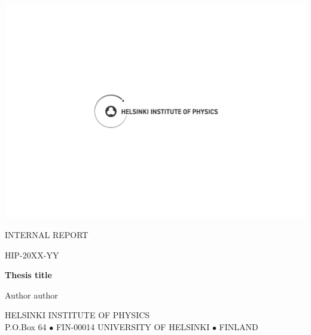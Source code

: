 \documentclass[a4paper, 12pt]{article}
\begin{document}
\begin{titlepage}
\begin{center}
\includegraphics[scale=1]{HIP-cover-logo.pdf}
\end{center}
\vspace{0.2 cm}
\begin{center}
\large
INTERNAL REPORT

\vspace{0.2 cm}
\large

HIP-20XX-YY

\vspace{3.0 cm}
\huge
{\bf Thesis title}

\vspace{1.5 cm}
\LARGE
Author author

\normalsize

\vfill



{HELSINKI INSTITUTE OF PHYSICS}\\
\vspace{0.2 cm}
P.O.Box 64 $\bullet$ FIN-00014 UNIVERSITY OF HELSINKI $\bullet$ FINLAND
\vspace{2 cm}
\end{center}
\end{titlepage}
\end{document}
